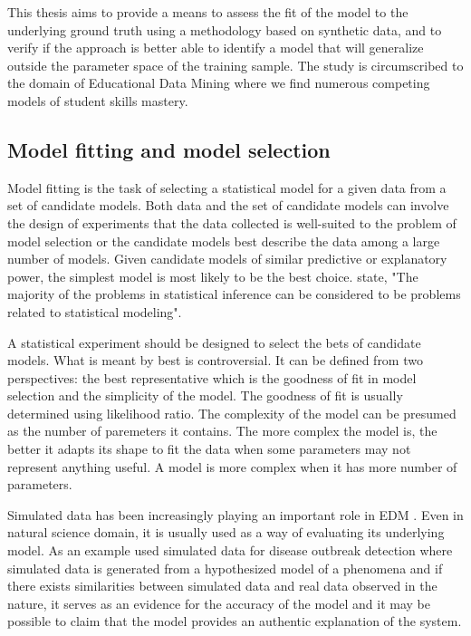 This thesis aims to provide a means to assess the fit of the model to the underlying ground truth using a methodology based on synthetic data, and to verify if the approach is better able to identify a model that will generalize outside the parameter space of the training sample.  The study is circumscribed to the domain of Educational Data Mining where we find numerous competing models of student skills mastery.

\subsection{Model fitting and model selection}

Model fitting is the task of selecting a statistical model for a given data from a set of candidate models. Both data and the set of candidate models can involve the design of experiments that the data collected is well-suited to the problem of model selection or the candidate models best describe the data among a large number of models. Given candidate models of similar predictive or explanatory power, the simplest model is most likely to be the best choice. \citet{konishi2008information} state, "The majority of the problems in statistical inference can be considered to be problems related to statistical modeling".

A statistical experiment should be designed to select the bets of candidate models. What is meant by best is controversial. It can be defined from two perspectives: the best representative which is the goodness of fit in model selection and the simplicity of the model. The goodness of fit is usually determined using likelihood ratio. The complexity of the model can be presumed as the number of paremeters it contains. The more complex the model is, the better it adapts its shape to fit the data when some parameters may not represent anything useful. A model is more complex when it has more number of parameters. 


Simulated data has been increasingly playing an important role in EDM \citep{JEDM:baker2009}. Even in natural science domain, it is usually used as a way of evaluating its underlying model. As an example \citep{jafarpour2015quantifying} used simulated data for disease outbreak detection where simulated data is generated from a hypothesized model of a phenomena and if there exists similarities between simulated data and real data observed in the nature, it serves as an evidence for the accuracy of the model and it may be possible to claim that the model provides an authentic explanation of the system. 

